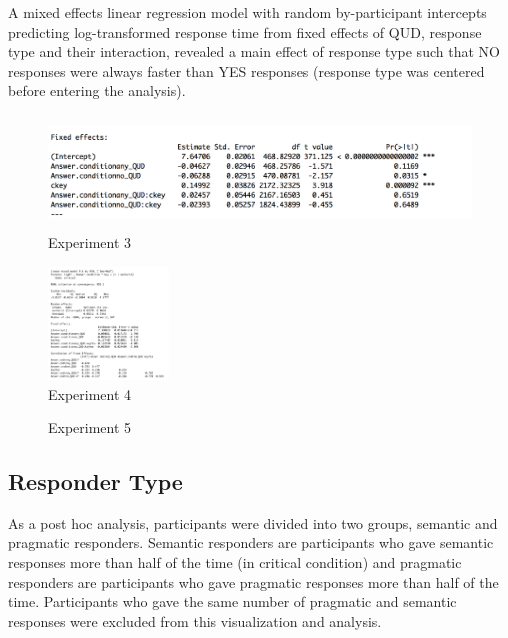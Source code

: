 \documentclass[12pt]{article}
\begin{document}
\noindent A mixed effects linear regression model with random by-participant intercepts predicting log-transformed response time from fixed effects of QUD, response type and their interaction, revealed a main effect of response type such that NO responses were always faster than YES responses (response type was centered before entering the analysis).\\

\begin{figure}[!ht]
    \caption*{Experiment 3}
    \includegraphics[height=3cm]{models/exp3_model2}
\end{figure}
\begin{figure}[!ht] 
    \caption*{Experiment 4}
    \includegraphics[height=3cm]{models/exp4_model2}
\end{figure}
\begin{figure}[!ht]
    \caption*{Experiment 5}
\end{figure} 

\pagebreak
\subsection*{Responder Type}
As a post hoc analysis, participants were divided into two groups, semantic and pragmatic responders. Semantic responders are participants who gave semantic responses more than half of the time (in critical condition) and pragmatic responders are participants who gave pragmatic responses more than half of the time. Participants who gave the same number of pragmatic and semantic responses were excluded from this visualization and analysis. 
\end{document}
